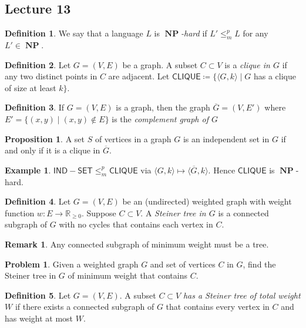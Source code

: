 \documentclass[10pt,letterpaper,cm]{nupset}
\theoremstyle{definition}
\newtheorem*{definition}{Definition}
\newtheorem{exmp}{Example}
\newtheorem{remark}{Remark}
\newtheorem{prop}{Proposition}
\newtheorem*{prob}{Problem}
\newcommand{\R}{\mathbb R}
\newcommand{\1}{\mathbf{1}}
\newcommand{\0}{\vec 0}
\DeclareMathOperator{\NP}{\mathbf{NP}}
\begin{document}
\subsection{Lecture 13}

\begin{definition}
We say that a language $L$ is \textit{$\NP$-hard} if $L' \leq_m^p L$ for any $L' \in \NP$.
\end{definition}

\begin{definition}
Let $G=(V,E)$ be a graph. A subset $C \subset V$ is a \textit{clique in $G$} if any two distinct points in $C$ are adjacent. Let $\mathsf{CLIQUE}\coloneqq \{\langle G, k \rangle \mid G$ has a clique of size at least $k\}$.
\end{definition}

\begin{definition}
If $G= (V,E)$ is a graph, then the graph $\overline{G} = (V, E')$ where $E' = \{(x,y) \mid (x,y) \notin E\}$ is the  \textit{complement graph of $G$} 
\end{definition}

\begin{prop}
 A set $S$ of vertices in a graph $G$ is an independent set in $G$ if and only if it is a clique in $\overline{G}$.
\end{prop}

\begin{exmp}
$\mathsf{IND{-}SET} \leq_m^p \mathsf{CLIQUE}$ via $\langle G, k \rangle \mapsto \langle \overline{G}, k \rangle$. Hence $\mathsf{CLIQUE}$ is $\NP$-hard.
\end{exmp}

\begin{definition}
Let $G= (V,E)$ be an (undirected) weighted graph with weight function $w : E \to \R_{\geq 0}$. Suppose $C \subset V$. A \textit{Steiner tree in $G$} is a connected subgraph of $G$ with no cycles that contains each vertex in $C$.
\end{definition}

\begin{remark}
Any connected subgraph of minimum weight must be a tree.
\end{remark}

\begin{prob}
Given a weighted graph $G$ and set of vertices $C$ in $G$, find the Steiner tree in $G$ of minimum weight that contains $C$.
\end{prob}

\begin{definition}
Let $G= (V,E)$. A subset $C\subset V$ \textit{has a Steiner tree of total weight $W$} if there exists a connected subgraph of $G$ that contains every vertex in $C$ and has weight at most $W$.
\end{definition}
\end{document}
